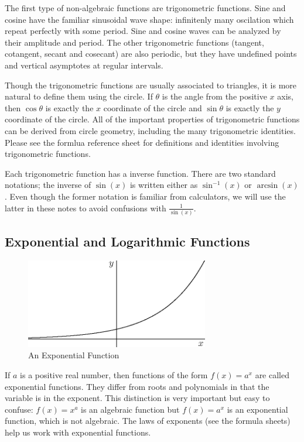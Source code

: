 \documentclass[fleqn]{report}
\begin{document}
The first type of non-algebraic functions are trigonometric
functions.  Sine and cosine have the familiar sinusoidal wave
shape: infinitenly many oscilation which repeat perfectly
with some period. Sine and cosine waves can be analyzed by
their amplitude and period. The other trigonometric functions
(tangent, cotangent, secant and cosecant) are also periodic,
but they have undefined points and vertical asymptotes at
regular intervals. 

Though the trigonometric functions are usually associated to triangles,
it is more natural to define them using the circle. If
$\theta$ is the angle from the positive $x$ axis, then $\cos
\theta$ is exactly the $x$ coordinate of the circle and $\sin
\theta$ is exactly the $y$ coordinate of the circle. All of
the important properties of trigonometric functions can be
derived from circle geometry, including the many trigonometric
identities. Please see the formlua reference sheet for
definitions and identities involving trigonometric functions.

Each trigonometric function has a inverse function. There are
two standard notations; the inverse of $\sin(x)$ is written
either as $\sin^{-1}(x)$ or $\arcsin(x)$. Even though the
former notation is familiar from calculators, we will use the
latter in these notes to avoid confusions with
$\frac{1}{\sin(x)}$.

\subsection{Exponential and Logarithmic Functions}
\label{exponential-functions}

\begin{figure}[t]
\centering
\includegraphics[width=8cm]{figure31.eps}
\caption{An Exponential Function}
\label{figure-an-exponential-function}
\end{figure}

If $a$ is a positive real number, then functions of the form
$f(x) = a^x$ are called exponential functions. They differ
from roots and polynomials in that the variable is in the
exponent. This distinction is very important but easy to
confuse: $f(x) = x^a$ is an algebraic function but $f(x) =
a^x$ is an exponential function, which is not algebraic.
The laws of exponents (see the formula sheets) help us work
with exponential functions.
\end{document}
